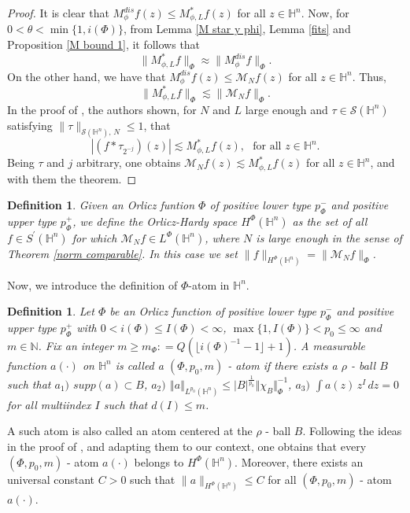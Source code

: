 \documentclass[oneside,10pt]{article}
\newtheorem{definition}[theorem]{Definition}
\begin{document}
\begin{proof}
It is clear that $M_{\phi}^{dis}f(z) \leq M_{\phi, L}^{*} f(z)$ for all $z \in \mathbb{H}^n$. Now, for $0 < \theta < \min \{1, i(\Phi) \}$, from Lemma \ref{M star y phi}, Lemma \ref{fits} and Proposition \ref{M bound 1}, it follows that
\[
\| M_{\phi, L}^{*} f \|_{\Phi} \approx \| M_{\phi}^{dis}f \|_{\Phi}.
\]
On the other hand, we have that $M_{\phi}^{dis}f(z) \leq \mathcal{M}_N f(z)$ for all $z \in \mathbb{H}^n$. Thus,
\[ 
\| M_{\phi, L}^{*} f \|_{\Phi} \lesssim \| \mathcal{M}_N f \|_{\Phi}.
\]
In the proof of \cite[Theorem 3.2]{Fang}, the authors shown, for $N$ and $L$ large enough 
and $\tau \in \mathcal{S}(\mathbb{H}^n)$ satisfying $\| \tau \|_{\mathcal{S}(\mathbb{H}^{n}), \, N} \leq 1$, that
\[
|(f \ast \tau_{2^{-j}})(z)| \lesssim M_{\phi, L}^{*} f (z), \,\,\,\, \text{for all} \,\, z \in \mathbb{H}^n.
\]
Being $\tau$ and $j$ arbitrary, one obtains $\mathcal{M}_N f(z) \lesssim M_{\phi, L}^{*} f (z)$ for all $z \in \mathbb{H}^n$, and with them 
the theorem.
\end{proof}


\begin{definition} \label{Orlicz Hardy space}
Given an Orlicz funtion $\Phi$ of positive lower type $p_{\Phi}^{-}$ and positive upper type $p_{\Phi}^{+}$, we define
the Orlicz-Hardy space $H^{\Phi}(\mathbb{H}^{n})$ as the set of all $f \in S^{\prime}(\mathbb{H}^{n})$ for which 
$\mathcal{M}_{N}f \in L^{\Phi}(\mathbb{H}^{n})$, where $N$ is large enough in the sense of Theorem \ref{norm comparable}. In this case 
we set $\| f \|_{H^{\Phi}(\mathbb{H}^{n})} = \| \mathcal{M}_{N}f \|_{\Phi}$.
\end{definition}

Now, we introduce the definition of $\Phi$-atom in $\mathbb{H}^n$.

\begin{definition} \label{atom def}
Let $\Phi$ be an Orlicz function of positive lower type $p_{\Phi}^{-}$ and positive upper type $p_{\Phi}^{+}$ with 
$0 < i(\Phi) \leq I(\Phi) < \infty$, $\max\{ 1, I(\Phi)  \} < p_0 \leq \infty$ and $m \in \mathbb{N}$. Fix an integer 
$m \geq m_{\Phi} : = Q \left(\lfloor i(\Phi)^{-1} - 1 \rfloor + 1 \right)$. A measurable function $a(\cdot)$ 
on $\mathbb{H}^{n}$ is called a $(\Phi, p_{0}, m)$ - atom if there exists a $\rho$ - ball $B$ such that \newline
$a_{1})$ $\textit{supp}\left( a\right) \subset B$, \newline
$a_{2})$ $\left\Vert a \right\Vert_{L^{p_{0}}(\mathbb{H}^{n})} \leq 
\left\vert B \right\vert^{\frac{1}{p_{0}}} \Vert \chi_B \Vert_{\Phi}^{-1}$, \newline
$a_{3})$ $\int a(z) \, z^{I} \, dz = 0$ for all multiindex $I$ such that $d(I) \leq m$.
\end{definition}
A such atom is also called an atom centered at the $\rho$ - ball $B$. Following the ideas in the proof of \cite[Proposition 4.1]{Fang}, and adapting them to our context, one obtains that every $(\Phi, p_{0}, m)$ - atom 
$a(\cdot)$ belongs to $H^{\Phi}(\mathbb{H}^{n})$. Moreover, there exists an universal constant $C > 0$ 
such that $\| a \|_{H^{\Phi}(\mathbb{H}^n)} \leq C$ for all $(\Phi, p_{0}, m)$ - atom $a(\cdot)$.
\end{document}
